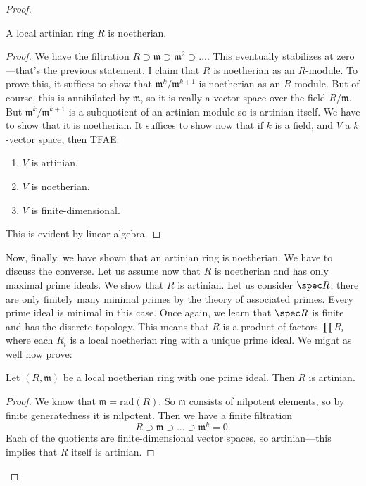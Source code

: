 \begin{proof}
\begin{lemma} 
A local artinian ring $R$ is noetherian.
\end{lemma} 
\begin{proof} 
We have the filtration $R \supset \mathfrak{m} \supset \mathfrak{m}^2 \supset
\dots$. This eventually stabilizes at zero---that's the previous statement. I
claim that $R$ is noetherian as an $R$-module. To prove this, it suffices to
show that $\mathfrak{m}^k/\mathfrak{m}^{k+1}$ is noetherian as an $R$-module.
But of course, this is annihilated by $\mathfrak{m}$, so it is really a vector
space over the field $R/\mathfrak{m}$. But $\mathfrak{m}^k/\mathfrak{m}^{k+1}$
is a subquotient of an artinian module so is artinian itself. We have to show
that it is noetherian. 
It suffices to show now that if $k$ is a field, and $V$ a $k$-vector space,
then TFAE:
\begin{enumerate}
\item $V$ is artinian. 
\item $V$ is noetherian.
\item $V$ is finite-dimensional.
\end{enumerate}
This is evident by linear algebra. 	
\end{proof} 

Now, finally, we have shown that an artinian ring is noetherian. We have to
discuss the converse. Let us assume now that $R$ is noetherian and has only
maximal prime ideals. We show that $R$ is artinian. Let us consider $\spec R$;
there are only finitely many minimal primes by the theory of associated primes.
Every prime ideal is minimal in this case. Once again, we learn that $\spec R$
is finite and has the discrete topology. This means that $R$ is a product of
factors $\prod R_i$ where each $R_i$ is a local noetherian ring with a unique
prime ideal. We might as well now prove:

\begin{lemma} 
Let $(R, \mathfrak{m})$ be a local noetherian ring with one prime ideal. Then
$R$ is artinian.
\end{lemma} 
\begin{proof} 
We know that $\mathfrak{m} = \mathrm{rad}(R)$. So $\mathfrak{m}$ consists of
nilpotent elements, so by finite generatedness it is nilpotent.  Then we have a
finite filtration
\[ R \supset \mathfrak{m} \supset \dots \supset \mathfrak{m}^k = 0.  \]
Each of the quotients are finite-dimensional vector spaces, so artinian---this
implies that $R$ itself is artinian. 

\end{proof} 


\end{proof} 

